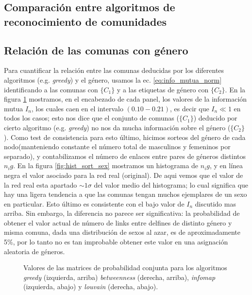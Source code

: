 \subsection{Comparaci\'on entre algoritmos de reconocimiento de comunidades}


\newpage
\subsection{Relaci\'on de las comunas con g\'enero}
\label{sec:relacion_con_genero}

Para cuantificar la relaci\'on entre las comunas deducidas por los diferentes algoritmos (e.g. {\it greedy}) y el g\'enero, usamos la ec. \ref{eq:info_mutua_norm} identificando a las comunas con $\{C_1\}$ y a las etiquetas de g\'enero con $\{C_2\}$.
En la figura \ref{fig:prob_conj} mostramos, en el encabezado de cada panel, los valores de la informaci\'on mutua $I_n$, los cuales caen en el intervalo $(0.10 - 0.21)$, es decir que $I_n \ll 1$ en todos los casos; esto nos dice que el conjunto de comunas ($\{C_1\}$) deducido por cierto algoritmo (e.g. {\it greedy}) no nos da mucha informaci\'on sobre el g\'enero ($\{C_2\}$).
Como test de consistencia para esto  \'ultimo, hicimos sorteos del g\'enero de cada nodo(manteniendo constante el n\'umero total de masculinos y femeninos por separado), y contabilizamos el n\'umero de enlaces entre pares de g\'eneros distintos $n_ig$.
En la figura \ref{fig:hist_sort_sex} mostramos un histograma de $n_ig$, y en l\'inea negra el valor asociado para la red real (original).
De aqui vemos que el valor de la red real esta apartado $\sim 1 \sigma$ del valor medio del histograma; lo cual significa que hay una ligera tendencia a que las comunas tengan muchos ejemplares de un sexo en particular. 
Esto \'ultimo es consistente con el bajo valor de $I_n$ discutido mas arriba.
Sin embargo, la diferencia no parece ser significativa: la probabilidad de obtener el valor actual de número de links entre delfines de distinto género y misma comuna, dada una distribución de sexos al azar, es de aproximadamente 5\%, por lo tanto no es tan improbable obtener este valor en una asignación aleatoria de géneros.



\begin{figure}
    \centering
    \caption{
    Valores de las matrices de probabilidad conjunta para los algoritmos {\it greedy} (izquierda, arriba) {\it betweenness} (derecha, arriba), {\it infomap} (izquierda, abajo) y {\it louvain} (derecha, abajo). 
    }
\label{fig:prob_conj}
\end{figure}


